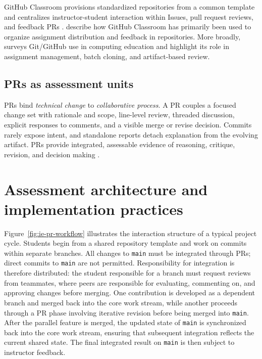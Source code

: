 GitHub Classroom provisions standardized repositories from a common template and centralizes instructor-student interaction within Issues, pull request reviews, and feedback PRs  \parencite[for documentation]{github_collaboration_workflow}. \textcite{bennedsen2022usinggithub} describe how GitHub Classroom has primarily been used to organize assignment distribution and feedback in repositories. More broadly, \textcite{githubsurvey} surveys Git/GitHub use in computing education and highlight its role in assignment management, batch cloning, and artifact-based review.


\subsection{PRs as assessment units}

PRs bind \emph{technical change} to \emph{collaborative process}. A PR couples a focused change set with rationale and scope, line-level review, threaded discussion, explicit responses to comments, and a visible merge or revise decision. Commits rarely expose intent, and standalone reports detach explanation from the evolving artifact. PRs provide integrated, assessable evidence of reasoning, critique, revision, and decision making \parencite{PetreWilson2014WSSSPE,githubsurvey}.


\section{Assessment architecture and implementation practices}
Figure~\ref{fig:ie-pr-workflow} illustrates the interaction structure of a typical project cycle. Students begin from a shared repository template and work on commits within separate branches. All changes to \texttt{main} must be integrated through PRs; direct commits to \texttt{main} are not permitted. Responsibility for integration is therefore distributed: the student responsible for a branch must request reviews from teammates, where peers are responsible for evaluating, commenting on, and approving changes before merging. One contribution is developed as a dependent branch and merged back into the core work stream, while another proceeds through a PR phase involving iterative revision before being merged into \texttt{main}. After the parallel feature is merged, the updated state of \texttt{main} is synchronized back into the core work stream, ensuring that subsequent integration reflects the current shared state. The final integrated result on \texttt{main} is then subject to instructor feedback.

